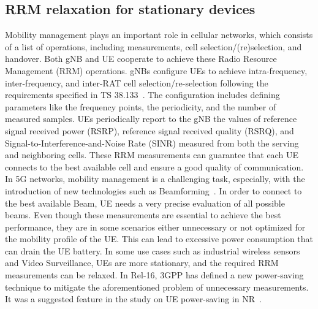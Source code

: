 \documentclass[]{IEEEtran}
\begin{document}
\subsection{RRM relaxation for stationary devices}
\label{sec:5-2}



Mobility management plays an important role in cellular networks, which consists of a list of operations, including measurements, cell selection/(re)selection, and handover. 
Both gNB and UE cooperate to achieve these Radio Resource Management (RRM) operations.
gNBs configure UEs to achieve intra-frequency, inter-frequency, and inter-RAT cell selection/re-selection following the requirements specified in TS 38.133~\cite{3gpp_nr_2022-11_38.133}. 
The configuration includes defining parameters like the frequency points, the periodicity, and the number of measured samples.
UEs periodically report to the gNB the values of reference signal received power (RSRP), reference signal received quality (RSRQ), and Signal-to-Interference-and-Noise Rate (SINR) measured from both the serving and neighboring cells.
These RRM measurements can guarantee that each UE connects to the best available cell and ensure a good quality of communication.
In 5G networks, mobility management is a challenging task, especially, with the introduction of new technologies such as Beamforming~\cite{kumar2021analytical}. 
In order to connect to the best available Beam, UE needs a very precise evaluation of all possible beams. 
Even though these measurements are essential to achieve the best performance, they are in some scenarios either unnecessary or not optimized for the mobility profile of the UE. 
This can lead to excessive power consumption that can drain the UE battery. 
In some use cases such as industrial wireless sensors and Video Surveillance, UEs are more stationary, and the required RRM measurements can be relaxed.
In Rel-16, 3GPP has defined a new power-saving technique to mitigate the aforementioned problem of unnecessary measurements. It was a suggested feature in the study on UE power-saving in NR~\cite{3gpp_study_2019_38.840}.
\end{document}

